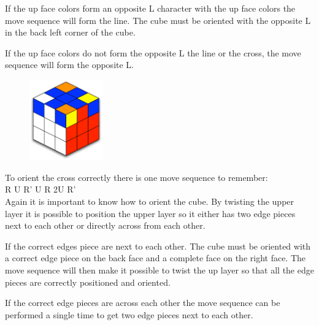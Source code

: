If the up face colors form an opposite L character with the up face colors the move sequence will form the line. The cube must be oriented with the opposite L in the back left corner of the cube. 

If the up face colors do not form the opposite L the line or the cross, the move sequence will form the opposite L.

\begin{figure}
\begin{center}
	\includegraphics[width=0.28\textwidth]{input/pics/7LLedges}	
\end{center}
\caption{}
\label{fig:7LLedges}
\end{figure}


To orient the cross correctly there is one move sequence to remember: \\

R U R' U R 2U R' \\

Again it is important to know how to orient the cube. By twisting the upper layer it is possible to position the upper layer so it either has two edge pieces next to each other or directly across from each other.

If the correct edges piece are next to each other. The cube must be oriented with a correct edge piece on the back face and a complete face on the right face. The move sequence will then make it possible to twist the up layer so that all the edge pieces are correctly positioned and oriented.

If the correct edge pieces are across each other the move sequence can be performed a single time to get two edge pieces next to each other.


